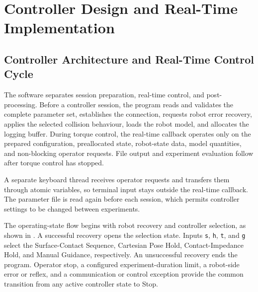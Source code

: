 \chapter{Controller Design and Real-Time Implementation}
\label{ch:implementation}



\section{Controller Architecture and Real-Time Control Cycle}
\label{sec:software_architecture}
\label{sec:real_time_control_loop}

The software separates session preparation, real-time control, and
post-processing. Before a controller session, the program reads and validates
the complete parameter set, establishes the \mbox{} connection,
requests robot error recovery, applies the selected collision behaviour, loads
the robot model, and allocates the logging buffer. During torque control, the
real-time callback operates only on the prepared configuration, preallocated
state, robot-state data, model quantities, and non-blocking operator requests.
File output and experiment evaluation follow after torque control has stopped.

A separate keyboard thread receives operator requests and transfers them
through atomic variables, so terminal input stays outside the real-time
callback. The parameter file is read again before each session, which permits
controller settings to be changed between experiments.

The operating-state flow begins with robot recovery and controller selection,
as shown in \mbox{}. A successful recovery
opens the selection state. Inputs \texttt{s}, \texttt{h}, \texttt{t}, and
\texttt{g} select the Surface-Contact Sequence, Cartesian Pose Hold,
Contact-Impedance Hold, and Manual Guidance, respectively. An unsuccessful
recovery ends the program. Operator stop, a configured experiment-duration
limit, a robot-side error or reflex, and a communication or control exception
provide the common transition from any active controller state to Stop.

